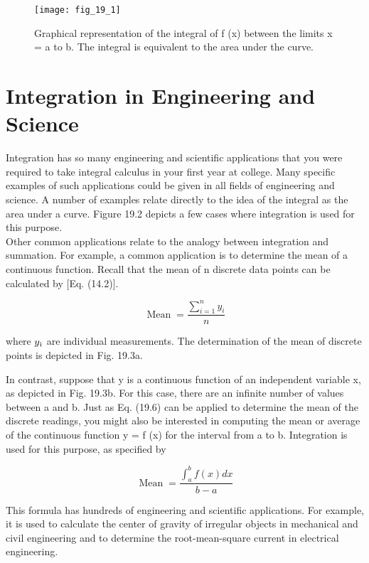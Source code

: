 \documentclass[../main.tex]{subfiles}
\begin{document}
\begin{figure}[H]
    \centering
    \texttt{[image: fig\_19\_1]}
   \caption{\textsf{Graphical representation of the integral of f (x) between the limits x = a to b. The integral is
   equivalent to the area under the curve.}}\label{fig:fig_19_1}
\end{figure}

\section{Integration in Engineering and Science}
Integration has so many engineering and scientific applications that you were required to
take integral calculus in your first year at college. Many specific examples of such applications could be given in all fields of engineering and science. A number of examples relate directly to the idea of the integral as the area under a curve. Figure 19.2 depicts a few
cases where integration is used for this purpose.\\

Other common applications relate to the analogy between integration and summation.
For example, a common application is to determine the mean of a continuous function.
Recall that the mean of n discrete data points can be calculated by [Eq. (14.2)].

\begin{equation}
    \tag{19.6}
	\operatorname{Mean}=\frac{\sum_{i=1}^{n} y_{i}}{n}
	\end{equation}

	where $y\textsubscript{i}$ are individual measurements. The determination of the mean of discrete points is
	depicted in Fig. 19.3a.

	In contrast, suppose that y is a continuous function of an independent variable x, as
	depicted in Fig. 19.3b. For this case, there are an infinite number of values between a and
	b. Just as Eq. (19.6) can be applied to determine the mean of the discrete readings,
	you might also be interested in computing the mean or average of the continuous function
	y = f (x) for the interval from a to b. Integration is used for this purpose, as specified by 

	\begin{equation}
		\tag{19.7}
		\operatorname{Mean}=\frac{\int_{a}^{b} f(x) d x}{b-a}
		\end{equation}

		This formula has hundreds of engineering and scientific applications. For example, it is
		used to calculate the center of gravity of irregular objects in mechanical and civil engineering and to determine the root-mean-square current in electrical engineering.
\end{document}
